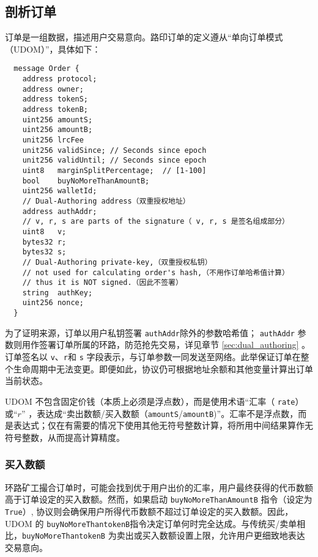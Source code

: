 \documentclass[UTF8,nofonts]{ctexart}%
\begin{document}
\begin{multicols}{2}
\subsection{剖析订单\label{anatomy}}
订单是一组数据，描述用户交易意向。路印订单的定义遵从“单向订单模式（UDOM）”，具体如下：

\begin{verbatim}
  message Order {
    address protocol;
    address owner;
    address tokenS;
    address tokenB;
    uint256 amountS;
    uint256 amountB;
    unit256 lrcFee
    unit256 validSince; // Seconds since epoch
    unit256 validUntil; // Seconds since epoch
    uint8   marginSplitPercentage;  // [1-100]
    bool    buyNoMoreThanAmountB;
    uint256 walletId;
    // Dual-Authoring address（双重授权地址）
    address authAddr;
   	// v, r, s are parts of the signature（ v, r, s 是签名组成部分）
    uint8   v;       
    bytes32 r;
    bytes32 s;
    // Dual-Authoring private-key,（双重授权私钥）
    // not used for calculating order's hash,（不用作订单哈希值计算）
    // thus it is NOT signed.（因此不签署）
    string  authKey;          
    uint256 nonce;
  }
\end{verbatim}


为了证明来源，订单以用户私钥签署 \verb|authAddr|除外的参数哈希值； \verb|authAddr| 参数则用作签署订单所属的环路，防范抢先交易，详见章节 \ref{sec:dual_authoring} 。订单签名以 \verb|v|、\verb|r|和 \verb|s| 字段表示，与订单参数一同发送至网络。此举保证订单在整个生命周期中无法变更。即便如此，协议仍可根据地址余额和其他变量计算出订单当前状态。



UDOM 不包含固定价钱（本质上必须是浮点数），而是使用术语“汇率（ \verb|rate|）或“$r$” ，表达成“卖出数额/买入数额（\verb|amountS|/\verb|amountB|)”。汇率不是浮点数，而是表达式；仅在有需要的情况下使用其他无符号整数计算，将所用中间结果算作无符号整数，从而提高计算精度。

\subsubsection{买入数额}

环路矿工撮合订单时，可能会找到优于用户出价的汇率，用户最终获得的代币数额高于订单设定的买入数额。然而，如果启动 \verb|buyNoMoreThanAmountB| 指令（设定为 \verb|True|）, 协议则会确保用户所得代币数额不超过订单设定的买入数额。因此，UDOM 的 \verb|buyNoMoreThantokenB|指令决定订单何时完全达成。与传统买/卖单相比，\verb|buyNoMoreThantokenB| 为卖出或买入数额设置上限，允许用户更细致地表达交易意向。


\end{multicols}
\end{document}
